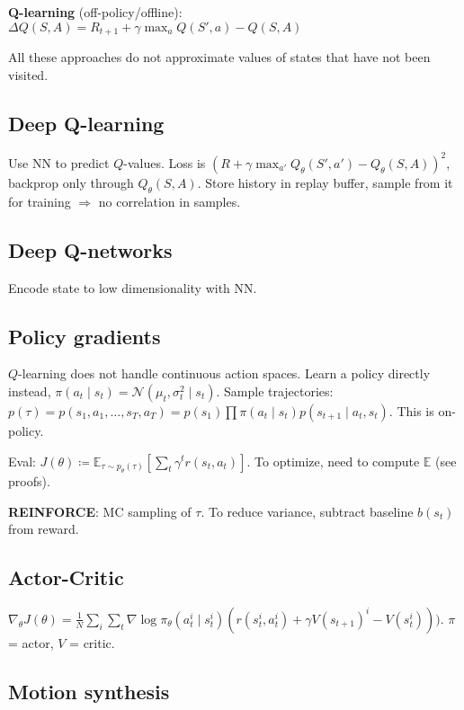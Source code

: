 \documentclass[11pt,landscape,a4paper,fleqn]{article}
\newcommand{\E}{\mathbb{E}}
\begin{document}
\begin{multicols*}{4}
\textbf{Q-learning} (off-policy/offline):
$\Delta Q(S, A) = R_{t+1} + \gamma \max_a Q(S', a) - Q(S, A)$

All these approaches do not approximate values of states that have not been visited.

\subsection{Deep Q-learning}

Use NN to predict $Q$-values.
Loss is $(R + \gamma \max_{a'}Q_\theta(S', a') - Q_\theta(S, A))^2$,
backprop only through $Q_\theta(S, A)$.
Store history in replay buffer, sample from it for training $ \Rightarrow $ no correlation in samples.

\subsection{Deep Q-networks}

Encode state to low dimensionality with NN.

\subsection{Policy gradients}

$Q$-learning does not handle continuous action spaces.
Learn a policy directly instead,
$\pi(a_t \mid s_t) = \mathcal{N}(\mu_t, \sigma_t^2 \mid s_t)$.
Sample trajectories: $p(\tau) = p(s_1, a_1, \dots, s_T, a_T) = p(s_1) \prod \pi(a_t \!\!\mid\!\! s_t) p(s_{t+1} \!\!\mid\!\! a_t, s_t)$.
This is on-policy.

Eval: $J(\theta) \coloneqq \E_{\tau \sim p_\theta(\tau)} [\sum_t \gamma^t r(s_t, a_t)]$.
To optimize, need to compute $\E$ (see proofs).

\textbf{REINFORCE}: MC sampling of $\tau$.
To reduce variance, subtract baseline $b(s_t)$ from reward.

\subsection{Actor-Critic}

$\nabla_\theta J(\theta) = \frac{1}{N} \sum_i \sum_t \nabla \log \pi_\theta(a_t^i \mid s_t^i)(r(s_t^i, a_t^i) + \gamma V(s_{t+1})^i - V(s_t^i)))$. $\pi$ = actor, $V$ = critic.

\subsection{Motion synthesis}


\end{multicols*}
\end{document}
